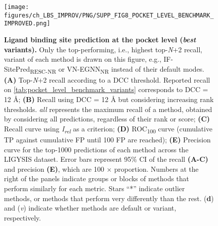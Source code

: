 \begin{figure}[htb!]
    \centering
    \texttt{[image: figures/ch\_LBS\_IMPROV/PNG/SUPP\_FIG8\_POCKET\_LEVEL\_BENCHMARK\_IMPROVED.png]}
    \caption[Ligand binding site prediction at the pocket level (\textit{best} variants)]{\textbf{Ligand binding site prediction at the pocket level (\textit{best} variants).} Only the top-performing, i.e., highest top-\textit{N}+2 recall, variant of each method is drawn on this figure, e.g., IF-SitePred\textsubscript{RESC-NR} or VN-EGNN\textsubscript{NR} instead of their default modes. \textbf{(A)} Top-\textit{N}+2 recall according to a DCC threshold. Reported recall on \autoref{tab:pocket_level_benchmark_variants} corresponds to DCC = 12 \AA{}; \textbf{(B)} Recall using DCC = 12 \AA{} but considering increasing rank thresholds. \textit{all} represents the maximum recall of a method, obtained by considering all predictions, regardless of their rank or score; \textbf{(C)} Recall curve using \textit{I\textsubscript{rel}} as a criterion; \textbf{(D)} ROC\textsubscript{100} curve (cumulative TP against cumulative FP until 100 FP are reached); \textbf{(E)} Precision curve for the top-1000 predictions of each method across the LIGYSIS dataset. Error bars represent 95\% CI of the recall \textbf{(A-C)} and precision \textbf{(E)}, which are 100 $\times$ proportion. Numbers at the right of the panels indicate groups or blocks of methods that perform similarly for each metric. Stars ``*'' indicate outlier methods, or methods that perform very differently than the rest. (\textbf{d}) and (\textit{v}) indicate whether methods are default or variant, respectively.}
    \label{fig:pocket_level_benchmark_variants}
\end{figure}


